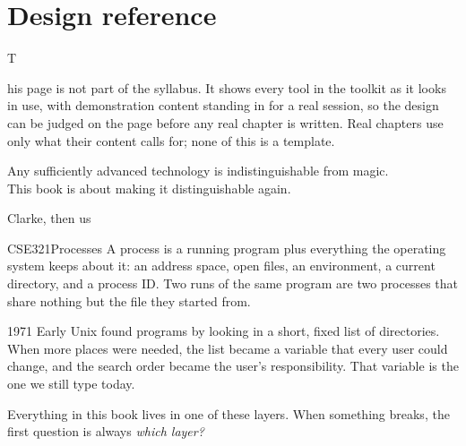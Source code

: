 \chapter*{Design reference}
\setcounter{figure}{0}

\opening{T}{his page is not} part of the syllabus. It shows every tool in the toolkit as it
looks in use, with demonstration content standing in for a real session, so the design can be
judged on the page before any real chapter is written. Real chapters use only what their
content calls for; none of this is a template.

\epigraph{Any sufficiently advanced technology is indistinguishable from magic.\\
This book is about making it distinguishable again.}{Clarke, then us}


\begin{refresher}{CSE321}{Processes}
A process is a running program plus everything the operating system keeps about it: an address
space, open files, an environment, a current directory, and a process ID. Two runs of the same
program are two processes that share nothing but the file they started from.
\end{refresher}


\begin{backintime}{1971}
Early Unix found programs by looking in a short, fixed list of directories. When more places
were needed, the list became a variable that every user could change, and the search order
became the user's responsibility. That variable is the one we still type today.
\end{backintime}


\begin{mentalmodel}
Everything in this book lives in one of these layers. When something breaks, the first
question is always \emph{which layer?}
\par\medskip
\centering{}
\end{mentalmodel}


